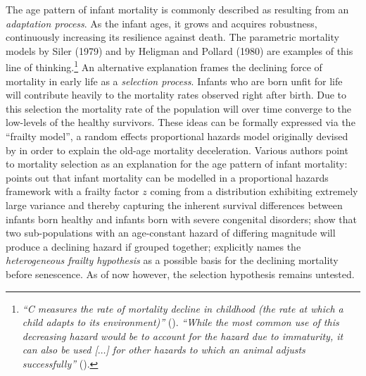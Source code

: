 \documentclass[12pt, parskip=half]{scrartcl}
\begin{document}
The age pattern of infant mortality is commonly described as resulting from an \emph{adaptation process}. As the infant ages, it grows and acquires robustness, continuously increasing its resilience against death. The parametric mortality models by Siler (1979) and by Heligman and Pollard (1980) are examples of this line of thinking.\footnote{
  \emph{\enquote{C measures the rate of mortality decline in childhood (the rate at which a child adapts to its environment)}} (\cite{Heligman1980}). \emph{\enquote{While the most common use of this decreasing hazard would be to account for the hazard due to immaturity, it can also be used [$\ldots$] for other hazards to which an animal adjusts successfully}} (\cite{Siler1979}).
}
An alternative explanation frames the declining force of mortality in early life as a \emph{selection process}. Infants who are born unfit for life will contribute heavily to the mortality rates observed right after birth. Due to this selection the mortality rate of the population will over time converge to the low-levels of the healthy survivors. These ideas can be formally expressed via the \enquote{frailty model}, a random effects proportional hazards model originally devised by \cite{Vaupel1979} in order to explain the old-age mortality deceleration. Various authors point to mortality selection as an explanation for the age pattern of infant mortality: \cite{Hougaard1984} points out that infant mortality can be modelled in a proportional hazards framework with a frailty factor $z$ coming from a distribution exhibiting extremely large variance and thereby capturing the inherent survival differences between infants born healthy and infants born with severe congenital disorders; \cite{Vaupel1985} show that two sub-populations with an age-constant hazard of differing magnitude will produce a declining hazard if grouped together; \cite{Levitis2011} explicitly names the \emph{heterogeneous frailty hypothesis} as a possible basis for the declining mortality before senescence. As of now however, the selection hypothesis remains untested.
\end{document}

